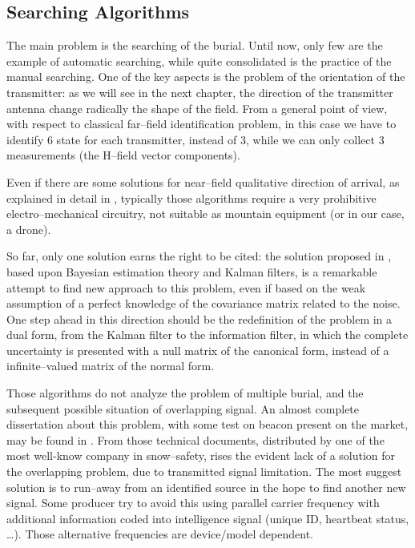 \subsection{Searching Algorithms}

The main problem is the searching of the burial. Until now, only few are the example of automatic searching, while quite consolidated is the practice of the manual searching. One of the key aspects is the problem of the orientation of the transmitter: as we will see in the next chapter, the direction of the transmitter antenna change radically the shape of the field. From a general point of view, with respect to classical far--field identification problem, in this case we have to identify 6 state for each transmitter, instead of 3, while we can only collect 3 measurements (the H--field vector components).

Even if there are some solutions for near--field qualitative direction of arrival, as explained in detail in \citep{hutchinson2000arrl}, typically those algorithms require a very prohibitive electro--mechanical circuitry, not suitable as mountain equipment (or in our case, a drone).

So far, only one solution earns the right to be cited: the solution proposed in \citep{pinies2006fast,pinies2006localization}, based upon Bayesian estimation theory and Kalman filters, is a remarkable attempt to find new approach to this problem, even if based on the weak assumption of a perfect knowledge of the covariance matrix related to the noise. One step ahead in this direction should be the redefinition of the problem in a dual form, from the Kalman filter to the information filter, in which the complete uncertainty is presented with a null matrix of the canonical form, instead of a infinite--valued matrix of the normal form. 

Those algorithms do not analyze the problem of multiple burial, and the subsequent possible situation of overlapping signal. An almost complete dissertation about this problem, with some test on beacon present on the market, may be found in \citep{signaloverlappingARVA1,signaloverlappingARVA2}. From those technical documents, distributed by one of the most well-know company in snow--safety, rises the evident lack of a solution for the overlapping problem, due to transmitted signal limitation. The most suggest solution is to run--away from an identified source in the hope to find another new signal. Some producer try to avoid this using parallel carrier frequency with additional information coded into intelligence signal (unique ID, heartbeat status, \dots). Those alternative frequencies are device/model dependent.


